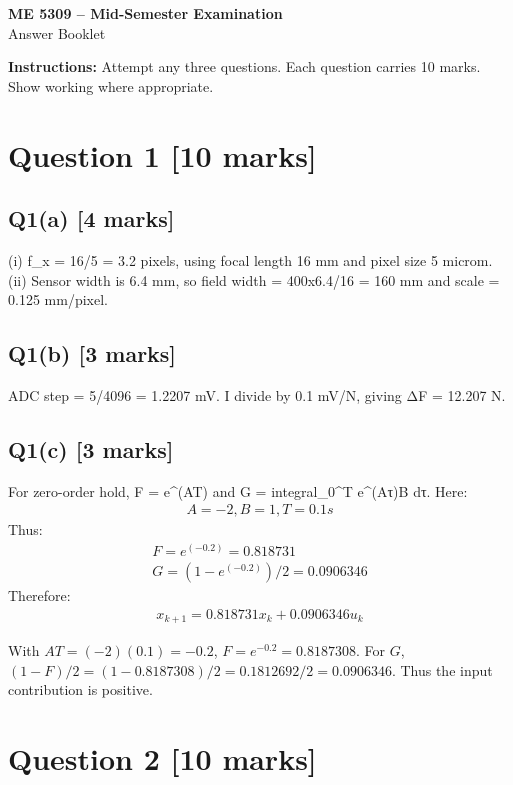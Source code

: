 \documentclass[11pt,a4paper]{article}
\begin{document}
\begin{center}
{\Large\bfseries ME 5309 -- Mid-Semester Examination}\\[3pt]
{\large Answer Booklet}\\[8pt]
\end{center}
\textbf{Instructions:} Attempt any three questions. Each question carries 10 marks. Show working where appropriate.
\section*{Question 1 \hfill [10 marks]}
\subsection*{Q1(a) \hfill [4 marks]}

(i) f\_x = 16/5 = 3.2 pixels, using focal length 16 mm and pixel size 5 microm.
(ii) Sensor width is 6.4 mm, so field width = 400x6.4/16 = 160 mm and scale = 0.125 mm/pixel.

\subsection*{Q1(b) \hfill [3 marks]}

ADC step = 5/4096 = 1.2207 mV.
I divide by 0.1 mV/N, giving ΔF = 12.207 N.

\subsection*{Q1(c) \hfill [3 marks]}

For zero-order hold, F = e\textasciicircum{}(AT) and G = integral\_0\textasciicircum{}T e\textasciicircum{}(Aτ)B dτ.
Here:\[\begin{aligned}A = -2, B = 1, T = 0.1 s\end{aligned}\]
Thus:\[\begin{aligned}F = e^(-0.2) = 0.818731\\ G = (1-e^(-0.2))/2 = 0.0906346\end{aligned}\]
Therefore:\[\begin{aligned}x_{k+1} = 0.818731 x_k + 0.0906346 u_k\end{aligned}\]\par\smallskip With $AT=(-2)(0.1)=-0.2$, $F=e^{-0.2}=0.8187308$. For $G$, $(1-F)/2=(1-0.8187308)/2=0.1812692/2=0.0906346$. Thus the input contribution is positive.

\section*{Question 2 \hfill [10 marks]}
\end{document}
